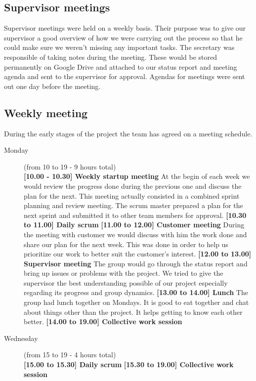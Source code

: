 \subsection{Supervisor meetings}
Supervisor meetings were held on a weekly basis.%
Their purpose was to give our supervisor a good overview of how we were carrying out the process
so that he could make sure we weren't missing any important tasks. The secretary was responsible of taking notes
during the meeting. These would be stored permanently on Google Drive and attached to our status report and
meeting agenda and sent to the supervisor for approval.
Agendas for meetings were sent out one day before the meeting.

\newpage
\subsection{Weekly meeting}
During the early stages of the project the team has agreed on a meeting schedule.

\begin{description}

\item[Monday] (from 10 to 19 - 9 hours total) \\
\textbf{[10.00 - 10.30] Weekly startup meeting}\newline
At the begin of each week we would review the progress done during the previous one and discuss the plan for the next.
This meeting actually consisted in a combined sprint planning and review meeting.
The scrum master prepared a plan for the next sprint and submitted it to other team members for approval.
\newline\textbf{[10.30 to 11.00] Daily scrum}
\newline\textbf{[11.00 to 12.00] Customer meeting}\newline
During the meeting with customer we would discuss with him the work done and share our plan for the next week.
This was done in order to help us prioritize our work to better suit the customer's interest.
\newline\textbf{[12.00 to 13.00] Supervisor meeting}\newline
The group would go through the status report and bring up issues or problems with the project.
We tried to give the supervisor the best understanding possible of our project especially regarding
its progress and group dynamics.
\newline\textbf{[13.00 to 14.00] Lunch}\newline
The group had lunch together on Mondays. It is good to eat together and chat about things other than the project.
It helps getting to know each other better.
\newline\textbf{[14.00 to 19.00] Collective work session}
\item[Wednesday] (from 15 to 19 - 4 hours total) \\
\textbf{[15.00 to 15.30] Daily scrum}
\newline\textbf{[15.30 to 19.00] Collective work session}\newline
\end{description}

